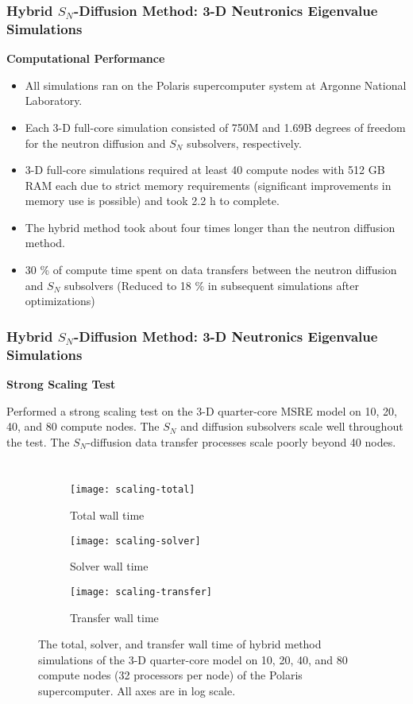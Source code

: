 \begin{frame}
  \frametitle{Hybrid $S_N$-Diffusion Method: 3-D Neutronics Eigenvalue Simulations}
  \textbf{Computational Performance}
  \begin{itemize}
    \item All simulations ran on the Polaris supercomputer system at Argonne National Laboratory.
    \item Each 3-D full-core simulation consisted of 750M and 1.69B degrees of freedom for the
      neutron diffusion and $S_N$ subsolvers, respectively.
    \item 3-D full-core simulations required at least 40 compute nodes with 512 GB RAM each due to
      strict memory requirements (significant improvements in memory use is possible) and took 2.2
      h to complete.
    \item The hybrid method took about four times longer than the neutron diffusion method.
    \item 30 \% of compute time spent on data transfers between the neutron diffusion and $S_N$
      subsolvers (Reduced to 18 \% in subsequent simulations after optimizations)
  \end{itemize}
\end{frame}

\begin{frame}
  \frametitle{Hybrid $S_N$-Diffusion Method: 3-D Neutronics Eigenvalue Simulations}
  \textbf{Strong Scaling Test}
  \vspace{.2cm}

  Performed a strong scaling test on the 3-D quarter-core MSRE model on 10, 20, 40, and 80 compute
  nodes. The $S_N$ and diffusion subsolvers scale well throughout the test.
  The $S_N$-diffusion data transfer processes scale poorly beyond 40 nodes.
  \begin{columns}
  \column{11cm}
  \begin{figure}[t]
    \centering
    \begin{subfigure}[b]{0.32\columnwidth}
      \centering
      \texttt{[image: scaling-total]}
      \caption{Total wall time}
    \end{subfigure}
    \begin{subfigure}[b]{0.32\columnwidth}
      \centering
      \texttt{[image: scaling-solver]}
      \caption{Solver wall time}
    \end{subfigure}
    \begin{subfigure}[b]{0.32\columnwidth}
      \centering
      \texttt{[image: scaling-transfer]}
      \caption{Transfer wall time}
    \end{subfigure}
    \caption{The total, solver, and transfer wall time of hybrid method simulations of the 3-D
    quarter-core model on 10, 20, 40, and 80 compute nodes (32 processors per node) of the Polaris
    supercomputer. All axes are in log scale.}
    \label{fig:scaling}
  \end{figure}
\end{columns}
\end{frame}
